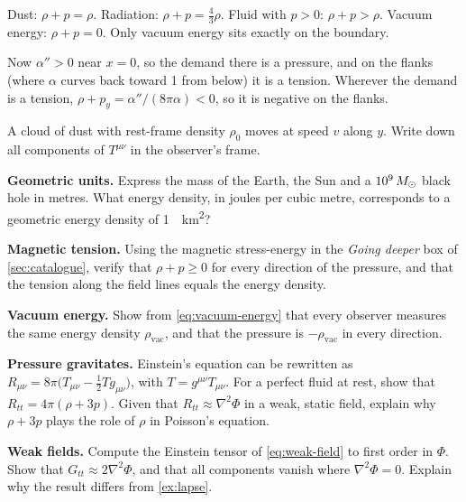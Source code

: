 \begin{checkanswers}
\item[3.1] Dust: $\rho + p = \rho$. Radiation: $\rho + p = \tfrac43\rho$. Fluid with
  $p > 0$: $\rho + p > \rho$. Vacuum energy: $\rho + p = 0$. Only vacuum energy
  sits exactly on the boundary.
\item[3.2] Now $\alpha'' > 0$ near $x = 0$, so the demand there is a pressure, and
  on the flanks (where $\alpha$ curves back toward 1 from below) it is a tension.
  Wherever the demand is a tension, $\rho + p_{y} = \alpha''/(8\pi\alpha) < 0$, so
  it is negative on the flanks.
\end{checkanswers}

\begin{problems}
\item {} A cloud of dust with rest-frame density $\rho_{0}$ moves at speed
  $v$ along $y$. Write down all components of $T^{\mu\nu}$ in the observer's
  frame.
\item {} \textbf{Geometric units.} Express the mass of the Earth, the Sun
  and a $10^{9}\,M_{\odot}$ black hole in metres. What energy density, in joules per
  cubic metre, corresponds to a geometric energy density of
  \SI{1}{\per\square\kilo\metre}?
\item {} \textbf{Magnetic tension.} Using the magnetic stress-energy in the
  \emph{Going deeper} box of \cref{sec:catalogue}, verify that
  $\rho + p \ge 0$ for every direction of the pressure, and that the tension along
  the field lines equals the energy density.
\item {} \textbf{Vacuum energy.} Show from \cref{eq:vacuum-energy} that
  every observer measures the same energy density $\rho_{\text{vac}}$, and that
  the pressure is $-\rho_{\text{vac}}$ in every direction.
\item {}\label{prob:rho-3p} \textbf{Pressure gravitates.} Einstein's
  equation can be rewritten as $R_{\mu\nu} = 8\pi\bigl(T_{\mu\nu} - \tfrac12 T g_{\mu\nu}\bigr)$,
  with $T = g^{\mu\nu}T_{\mu\nu}$. For a perfect fluid at rest, show that
  $R_{tt} = 4\pi(\rho + 3p)$. Given that $R_{tt} \approx \nabla^{2}\Phi$ in a weak,
  static field, explain why $\rho + 3p$ plays the role of $\rho$ in Poisson's
  equation.
\item {}\label{prob:weak-field} \textbf{Weak fields.} Compute the Einstein
  tensor of \cref{eq:weak-field} to first order in $\Phi$. Show that
  $G_{tt} \approx 2\nabla^{2}\Phi$, and that all components vanish where
  $\nabla^{2}\Phi = 0$. Explain why the result differs from \cref{ex:lapse}.

\end{problems}
